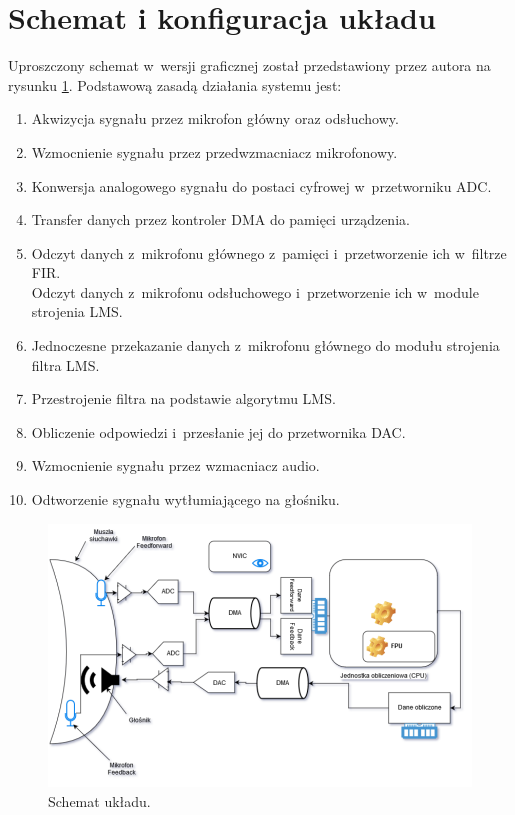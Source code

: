 \section{Schemat i konfiguracja układu}
\label{sec:config}
Uproszczony schemat w~wersji graficznej został przedstawiony przez autora na rysunku \ref{fig:schemat1}. Podstawową zasadą działania systemu jest:
\begin{enumerate}
	\item Akwizycja sygnału przez mikrofon główny oraz odsłuchowy.
	\item Wzmocnienie sygnału przez przedwzmacniacz mikrofonowy.
	\item Konwersja analogowego sygnału do postaci cyfrowej w~przetworniku ADC.
	\item Transfer danych przez kontroler DMA do pamięci urządzenia.
	\item Odczyt danych z~mikrofonu głównego z~pamięci i~przetworzenie ich w~filtrze FIR.\\
	Odczyt danych z~mikrofonu odsłuchowego i~przetworzenie ich w~module strojenia LMS.
	\item Jednoczesne przekazanie danych z~mikrofonu głównego do modułu strojenia filtra LMS.
	\item Przestrojenie filtra na podstawie algorytmu LMS.
	\item Obliczenie odpowiedzi i~przesłanie jej do przetwornika DAC.
	\item Wzmocnienie sygnału przez wzmacniacz audio.
	\item Odtworzenie sygnału wytłumiającego na głośniku.
\end{enumerate}
\begin{figure}[h!]
	\includegraphics[width=\linewidth]{../Assets/schemat_ukladu.png}	
	\caption{Schemat układu.}
	\label{fig:schemat1}
\end{figure}
